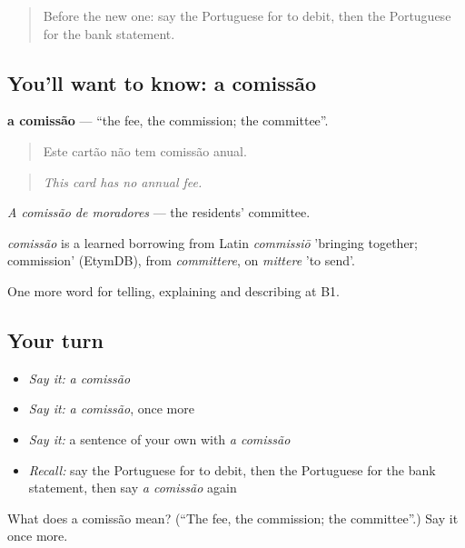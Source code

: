\label{lesson:PT-C455-comissao}



\begin{quote}
Before the new one: say the Portuguese for to debit, then the Portuguese for the bank statement.
\end{quote}

\subsection*{You'll want to know: a comissão}
\textbf{a comissão} — \textquotedblleft{}the fee, the commission; the committee\textquotedblright{}.

\begin{quote}
Este cartão não tem comissão anual.
\end{quote}

\begin{quote}
\emph{This card has no annual fee.}
\end{quote}

\emph{A comissão de moradores} — the residents' committee.

\begin{cousinweb}
\emph{comissão} is a learned borrowing from Latin \emph{commissiō} 'bringing together; commission' (EtymDB), from \emph{committere}, on \emph{mittere} 'to send'.
\end{cousinweb}

\begin{grammarlens}[title={What you've built}]
One more word for telling, explaining and describing at B1.
\end{grammarlens}

\subsection*{Your turn}
\begin{itemize}
\raggedright
  \item \emph{Say it:} \emph{a comissão}
  \item \emph{Say it:} \emph{a comissão}, once more
  \item \emph{Say it:} a sentence of your own with \emph{a comissão}
  \item \emph{Recall:} say the Portuguese for to debit, then the Portuguese for the bank statement, then say \emph{a comissão} again
\end{itemize}

\begin{tcolorbox}[breakable,colback=teal!4,colframe=teal!35!black,title={Before you move on}]
What does a comissão mean? (\textquotedblleft{}The fee, the commission; the committee\textquotedblright{}.) Say it once more.
\end{tcolorbox}
